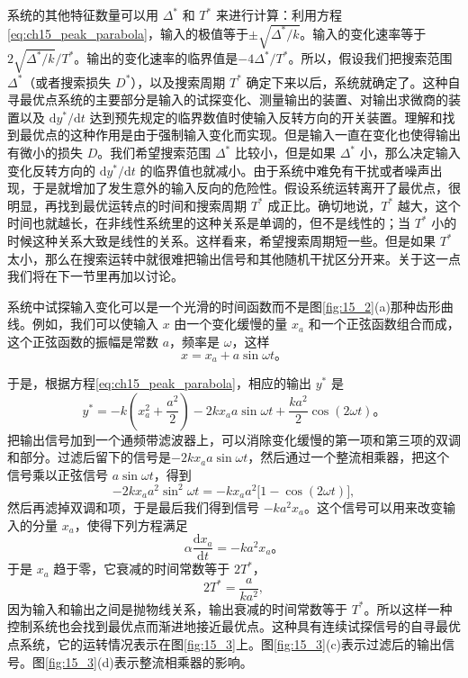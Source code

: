 系统的其他特征数量可以用 $\Delta^*$ 和 $T^*$ 来进行计算：利用方程\eqref{eq:ch15_peak_parabola}，输入的极值等于$\pm\sqrt{\Delta^*/k}$。输入的变化速率等于 $2\sqrt{\Delta^*/k}/T^*$。输出的变化速率的临界值是$-4\Delta^*/T^*$。所以，假设我们把搜索范围 $\Delta^*$（或者搜索损失 $D^*$），以及搜索周期 $T^*$ 确定下来以后，系统就确定了。这种自寻最优点系统的主要部分是输入的试探变化、测量输出的装置、对输出求微商的装置以及 $\mathrm{d}y^*/\mathrm{d}t$ 达到预先规定的临界数值时使输入反转方向的开关装置。理解和找到最优点的这种作用是由于强制输入变化而实现。但是输入一直在变化也使得输出有微小的损失 $D$。我们希望搜索范围 $\Delta^*$ 比较小，但是如果 $\Delta^*$ 小，那么决定输入变化反转方向的 $\mathrm{d}y^*/\mathrm{d}t$ 的临界值也就减小。由于系统中难免有干扰或者噪声出现，于是就增加了发生意外的输入反向的危险性。假设系统运转离开了最优点，很明显，再找到最优运转点的时间和搜索周期 $T^*$ 成正比。确切地说，$T^*$ 越大，这个时间也就越长，在非线性系统里的这种关系是单调的，但不是线性的；当 $T^*$ 小的时候这种关系大致是线性的关系。这样看来，希望搜索周期短一些。但是如果 $T^*$ 太小，那么在搜索运转中就很难把输出信号和其他随机干扰区分开来。关于这一点我们将在下一节里再加以讨论。

系统中试探输入变化可以是一个光滑的时间函数而不是图\ref{fig:15_2}(a)那种齿形曲线。例如，我们可以使输入 $x$ 由一个变化缓慢的量 $x_a$ 和一个正弦函数组合而成，这个正弦函数的振幅是常数 $a$，频率是 $\omega$，这样
\begin{equation}
x = x_a + a\sin\omega t。
\label{eq:ch15_sine_probe_input}
\end{equation}

于是，根据方程\eqref{eq:ch15_peak_parabola}，相应的输出 $y^*$ 是
\begin{equation}
y^* = -k\left(x_a^2+\frac{a^2}{2}\right)-2kx_a a\sin\omega t+\frac{ka^2}{2}\cos(2\omega t)。
\label{eq:ch15_sine_probe_output}
\end{equation}
把输出信号加到一个通频带滤波器上，可以消除变化缓慢的第一项和第三项的双调和部分。过滤后留下的信号是$-2kx_a a\sin\omega t$，然后通过一个整流相乘器，把这个信号乘以正弦信号 $a\sin\omega t$，得到
\begin{equation}
-2kx_a a^2\sin^2\omega t = -kx_a a^2\big[1-\cos(2\omega t)\big],
\label{eq:ch15_rectify_signal}
\end{equation}
然后再滤掉双调和项，于是最后我们得到信号 $-ka^2 x_a$。这个信号可以用来改变输入的分量 $x_a$，使得下列方程满足
\begin{equation}
\alpha \frac{\mathrm{d}x_a}{\mathrm{d}t} = -ka^2 x_a。
\label{eq:ch15_adapt_dynamic}
\end{equation}
于是 $x_a$ 趋于零，它衰减的时间常数等于 $2T^*$，
\begin{equation}
2T^* = \frac{a}{ka^2},
\label{eq:ch15_time_const_def}
\end{equation}
因为输入和输出之间是抛物线关系，输出衰减的时间常数等于 $T^*$。所以这样一种控制系统也会找到最优点而渐进地接近最优点。这种具有连续试探信号的自寻最优点系统，它的运转情况表示在图\ref{fig:15_3}上。图\ref{fig:15_3}(c)表示过滤后的输出信号。图\ref{fig:15_3}(d)表示整流相乘器的影响。

